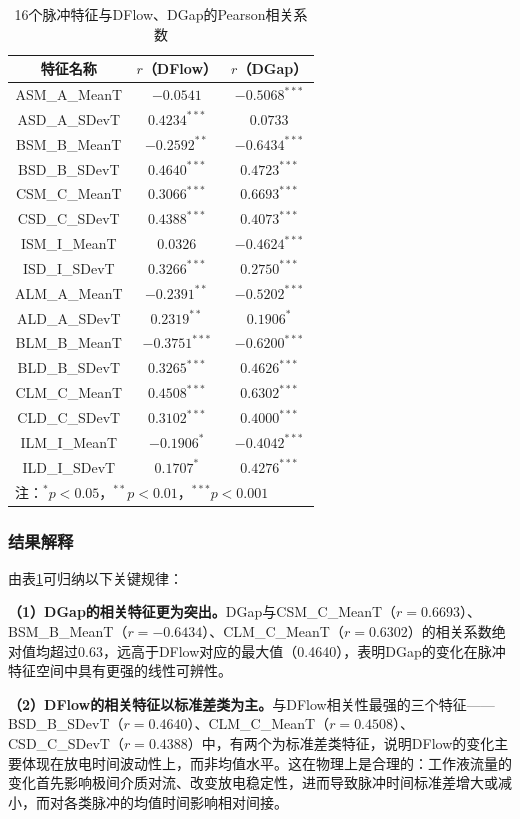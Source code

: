 \documentclass[UTF8,a4paper,12pt]{ctexart}
\begin{document}
\begin{table}[H]
\centering
\caption{16个脉冲特征与DFlow、DGap的Pearson相关系数}
\label{tab:corr-full}
\begin{tabular}{ccc}
\toprule
特征名称 & $r$（DFlow） & $r$（DGap） \\
\midrule
ASM\_A\_MeanT & $-0.0541$ & $-0.5068^{***}$ \\
ASD\_A\_SDevT & $0.4234^{***}$ & $0.0733$ \\
BSM\_B\_MeanT & $-0.2592^{**}$ & $-0.6434^{***}$ \\
BSD\_B\_SDevT & $0.4640^{***}$ & $0.4723^{***}$ \\
CSM\_C\_MeanT & $0.3066^{***}$ & $0.6693^{***}$ \\
CSD\_C\_SDevT & $0.4388^{***}$ & $0.4073^{***}$ \\
ISM\_I\_MeanT & $0.0326$ & $-0.4624^{***}$ \\
ISD\_I\_SDevT & $0.3266^{***}$ & $0.2750^{***}$ \\
ALM\_A\_MeanT & $-0.2391^{**}$ & $-0.5202^{***}$ \\
ALD\_A\_SDevT & $0.2319^{**}$ & $0.1906^{*}$ \\
BLM\_B\_MeanT & $-0.3751^{***}$ & $-0.6200^{***}$ \\
BLD\_B\_SDevT & $0.3265^{***}$ & $0.4626^{***}$ \\
CLM\_C\_MeanT & $0.4508^{***}$ & $0.6302^{***}$ \\
CLD\_C\_SDevT & $0.3102^{***}$ & $0.4000^{***}$ \\
ILM\_I\_MeanT & $-0.1906^{*}$ & $-0.4042^{***}$ \\
ILD\_I\_SDevT & $0.1707^{*}$ & $0.4276^{***}$ \\
\bottomrule
\multicolumn{3}{l}{\footnotesize 注：$^{*}p<0.05$，$^{**}p<0.01$，$^{***}p<0.001$}
\end{tabular}
\end{table}

\subsubsection{结果解释}

由表\ref{tab:corr-full}可归纳以下关键规律：

\textbf{（1）DGap的相关特征更为突出。}DGap与CSM\_C\_MeanT（$r=0.6693$）、BSM\_B\_MeanT（$r=-0.6434$）、CLM\_C\_MeanT（$r=0.6302$）的相关系数绝对值均超过0.63，远高于DFlow对应的最大值（0.4640），表明DGap的变化在脉冲特征空间中具有更强的线性可辨性。

\textbf{（2）DFlow的相关特征以标准差类为主。}与DFlow相关性最强的三个特征——BSD\_B\_SDevT（$r=0.4640$）、CLM\_C\_MeanT（$r=0.4508$）、CSD\_C\_SDevT（$r=0.4388$）中，有两个为标准差类特征，说明DFlow的变化主要体现在放电时间波动性上，而非均值水平。这在物理上是合理的：工作液流量的变化首先影响极间介质对流、改变放电稳定性，进而导致脉冲时间标准差增大或减小，而对各类脉冲的均值时间影响相对间接。
\end{document}
